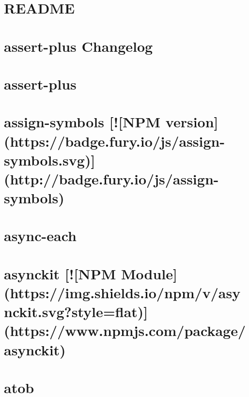 \documentclass[twoside]{book}
\newcommand{\+}{\discretionary{\mbox{\scriptsize$\hookleftarrow$}}{}{}}
\begin{document}
\chapter{R\+E\+A\+D\+ME}
\label{md_dsmacc_vis_degree_node_modules_asn1_README}

\chapter{assert-\/plus Changelog}
\label{md_dsmacc_vis_degree_node_modules_assert-plus_CHANGES}

\chapter{assert-\/plus}
\label{md_dsmacc_vis_degree_node_modules_assert-plus_README}

\chapter{assign-\/symbols \mbox{[}!\mbox{[}N\+PM version\mbox{]}(https\+://badge.fury.\+io/js/assign-\/symbols.svg)\mbox{]}(http\+://badge.fury.\+io/js/assign-\/symbols)}
\label{md_dsmacc_vis_degree_node_modules_assign-symbols_README}

\chapter{async-\/each}
\label{md_dsmacc_vis_degree_node_modules_async-each_README}

\chapter{asynckit \mbox{[}!\mbox{[}N\+PM Module\mbox{]}(https\+://img.shields.\+io/npm/v/asynckit.svg?style=flat)\mbox{]}(https\+://www.npmjs.\+com/package/asynckit)}
\label{md_dsmacc_vis_degree_node_modules_asynckit_README}

\chapter{atob}
\label{md_dsmacc_vis_degree_node_modules_atob_README}

\end{document}

